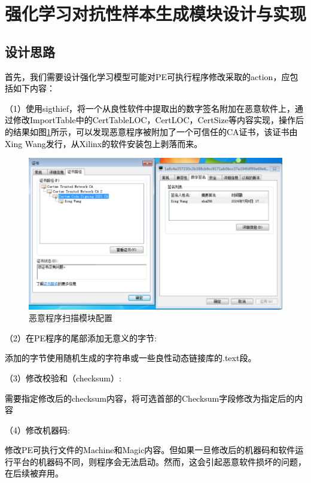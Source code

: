 \section{强化学习对抗性样本生成模块设计与实现}

\subsection{设计思路}

\textcolor{black}{首先，我们需要设计强化学习模型可能对PE可执行程序修改采取的action，应包括如下内容：}

\textcolor{black}{（1）使用sigthief，将一个从良性软件中提取出的数字签名附加在恶意软件上，通过修改ImportTable中的CertTableLOC，CertLOC，CertSize等内容实现，操作后的结果如图\ref{fig:certification_fabrication}所示，可以发现恶意程序被附加了一个可信任的CA证书，该证书由Xing Wang发行，从Xilinx的软件安装包上剥落而来。}

\begin{figure}
  \centering
  \includegraphics[]{images/certification_fabrication.png}
  \caption{恶意程序扫描模块配置}\label{fig:certification_fabrication}
\end{figure}

\textcolor{black}{（2）在PE程序的尾部添加无意义的字节:}

\textcolor{black}{添加的字节使用随机生成的字符串或一些良性动态链接库的.text段。}

\textcolor{black}{（3）修改校验和（checksum）:}

\textcolor{black}{需要指定修改后的checksum内容，将可选首部的Checksum字段修改为指定后的内容}

\textcolor{black}{（4）修改机器码:}

\textcolor{black}{修改PE可执行文件的Machine和Magic内容。但如果一旦修改后的机器码和软件运行平台的机器码不同，则程序会无法启动。然而，这会引起恶意软件损坏的问题，在后续被弃用。}

